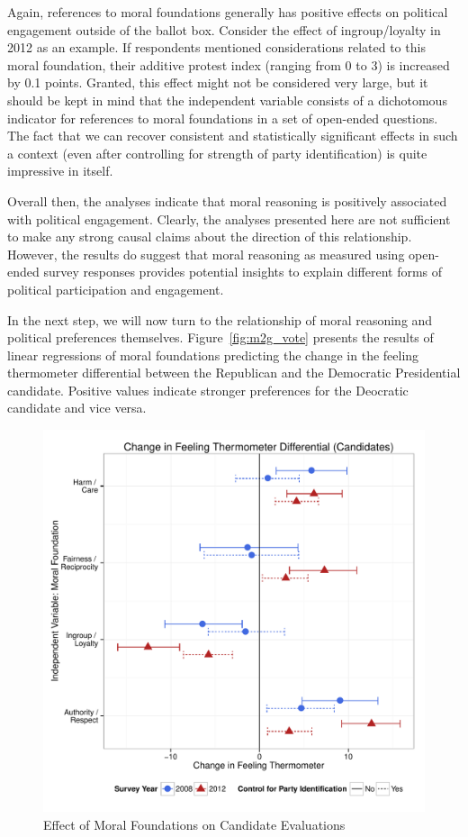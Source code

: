 \documentclass[12pt]{article}
\begin{document}
Again, references to moral foundations generally has positive effects on political engagement outside of the ballot box. Consider the effect of ingroup/loyalty in 2012 as an example. If respondents mentioned considerations related to this moral foundation, their additive protest index (ranging from 0 to 3) is increased by 0.1 points. Granted, this effect might not be considered very large, but it should be kept in mind that the independent variable consists of a dichotomous indicator for references to moral foundations in a set of open-ended questions. The fact that we can recover consistent and statistically significant effects in such a context (even after controlling for strength of party identification) is quite impressive in itself.

Overall then, the analyses indicate that moral reasoning is positively associated with political engagement. Clearly, the analyses presented here are not sufficient to make any strong causal claims about the direction of this relationship. However, the results do suggest that moral reasoning as measured using open-ended survey responses provides potential insights to explain different forms of political participation and engagement.

In the next step, we will now turn to the relationship of moral reasoning and political preferences themselves. Figure~\ref{fig:m2g_vote} presents the results of linear regressions of moral foundations predicting the change in the feeling thermometer differential between the Republican and the Democratic Presidential candidate. Positive values indicate stronger preferences for the Deocratic candidate and vice versa.

\begin{figure}[ht]\centering
\includegraphics[scale=.5]{../calc/fig/m2g_vote.pdf}
\caption{Effect of Moral Foundations on Candidate Evaluations}\label{fig:m2f_vote}
\end{figure}
\end{document}
